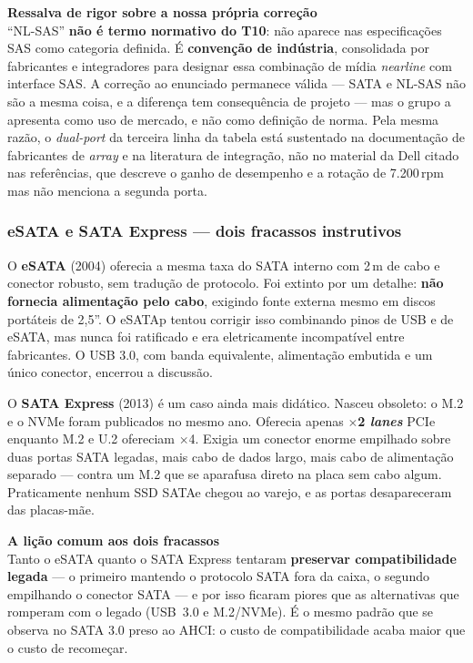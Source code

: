 \documentclass[11pt,a4paper]{article}
\newcommand{\destaque}[2]{%
  \begin{center}\begin{minipage}{0.96\textwidth}
  \colorbox{fundo}{\begin{minipage}{\dimexpr\linewidth-2\fboxsep}
  \vspace{3pt}\textbf{\color{azul}#1}\\[2pt]\small #2\vspace{4pt}
  \end{minipage}}\end{minipage}\end{center}}
\begin{document}
\destaque{Ressalva de rigor sobre a nossa própria correção}{%
``NL-SAS'' \textbf{não é termo normativo do T10}: não aparece nas especificações SAS como
categoria definida. É \textbf{convenção de indústria}, consolidada por fabricantes e
integradores para designar essa combinação de mídia \emph{nearline} com interface SAS. A
correção ao enunciado permanece válida --- SATA e NL-SAS não são a mesma coisa, e a
diferença tem consequência de projeto --- mas o grupo a apresenta como uso de mercado, e não
como definição de norma. Pela mesma razão, o \emph{dual-port} da terceira linha da tabela
está sustentado na documentação de fabricantes de \emph{array} e na literatura de
integração, não no material da Dell citado nas referências, que descreve o ganho de
desempenho e a rotação de 7.200\,rpm mas não menciona a segunda porta.}

\subsubsection{eSATA e SATA Express --- dois fracassos instrutivos}

O \textbf{eSATA} (2004) oferecia a mesma taxa do SATA interno com 2\,m de cabo e conector
robusto, sem tradução de protocolo. Foi extinto por um detalhe: \textbf{não fornecia
alimentação pelo cabo}, exigindo fonte externa mesmo em discos portáteis de 2,5''. O
eSATAp tentou corrigir isso combinando pinos de USB e de eSATA, mas nunca foi ratificado e
era eletricamente incompatível entre fabricantes. O USB 3.0, com banda equivalente,
alimentação embutida e um único conector, encerrou a discussão.

O \textbf{SATA Express} (2013) é um caso ainda mais didático. Nasceu obsoleto: o M.2 e o
NVMe foram publicados no mesmo ano. Oferecia apenas \textbf{$\times$2 \emph{lanes}} PCIe
enquanto M.2 e U.2 ofereciam $\times$4. Exigia um conector enorme empilhado sobre duas
portas SATA legadas, mais cabo de dados largo, mais cabo de alimentação separado --- contra
um M.2 que se aparafusa direto na placa sem cabo algum. Praticamente nenhum SSD SATAe
chegou ao varejo, e as portas desapareceram das placas-mãe.

\destaque{A lição comum aos dois fracassos}{%
Tanto o eSATA quanto o SATA Express tentaram \textbf{preservar compatibilidade legada} ---
o primeiro mantendo o protocolo SATA fora da caixa, o segundo empilhando o conector SATA
--- e por isso ficaram piores que as alternativas que romperam com o legado (USB~3.0 e
M.2/NVMe). É o mesmo padrão que se observa no SATA 3.0 preso ao AHCI: o custo de
compatibilidade acaba maior que o custo de recomeçar.}
\end{document}
